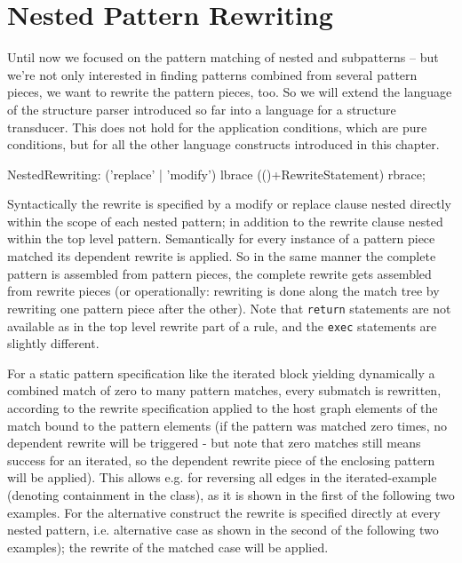 \section{Nested Pattern Rewriting}
\label{sec:nestedrewrite}

Until now we focused on the pattern matching of nested and subpatterns -- but we're not only interested in finding patterns combined from several pattern pieces, we want to rewrite the pattern pieces, too.
So we will extend the language of the structure parser introduced so far into a language for a structure transducer.
This does not hold for the application conditions, which are pure conditions, but for all the other language constructs introduced in this chapter.

\begin{rail}  
  NestedRewriting: ('replace' | 'modify') lbrace (()+RewriteStatement) rbrace;
\end{rail}

Syntactically the rewrite is specified by a modify or replace clause nested directly within the scope of each nested pattern;
in addition to the rewrite clause nested within the top level pattern.
Semantically for every instance of a pattern piece matched its dependent rewrite is applied. 
So in the same manner the complete pattern is assembled from pattern pieces, the complete rewrite gets assembled from rewrite pieces
(or operationally: rewriting is done along the match tree by rewriting one pattern piece after the other).
Note that \texttt{return} statements are not available as in the top level rewrite part of a rule, and the \texttt{exec} statements are slightly different.

For a static pattern specification like the iterated block yielding dynamically a combined match of zero to many pattern matches, every submatch is rewritten, according to the rewrite specification applied to the host graph elements of the match bound to the pattern elements
(if the pattern was matched zero times, no dependent rewrite will be triggered - but note that zero matches still means success for an iterated, so the dependent rewrite piece of the enclosing pattern will be applied).
This allows e.g. for reversing all edges in the iterated-example (denoting containment in the class), as it is shown in the first of the following two examples.
For the alternative construct the rewrite is specified directly at every nested pattern, i.e. alternative case as shown in the second of the following two examples); the rewrite of the matched case will be applied.

